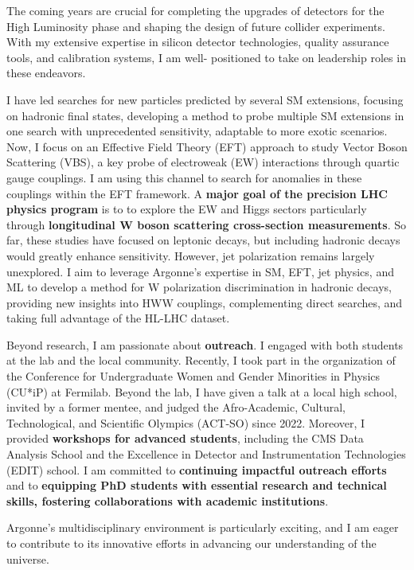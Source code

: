 {\begin{flushleft}
The coming years are crucial for completing the upgrades of detectors for the High Luminosity
phase and shaping the design of future collider experiments. With my extensive expertise in
silicon detector technologies, quality assurance tools, and calibration systems, I am well-
positioned to take on leadership roles in these endeavors.

I have led searches for new particles predicted by several SM extensions, focusing on hadronic final states, developing a method to probe multiple SM extensions in one search with unprecedented sensitivity, adaptable to more exotic scenarios. Now, I focus on an Effective Field Theory (EFT) approach to study Vector Boson Scattering (VBS), a key probe of electroweak (EW) interactions through quartic gauge couplings. I am using this channel to search for anomalies in these couplings within the EFT framework. 
A {\bf major goal of the precision LHC physics program} is to to explore the EW and Higgs sectors particularly through {\bf longitudinal W boson scattering cross-section measurements}.  So far, these studies have focused on leptonic decays, but including hadronic decays would greatly enhance sensitivity. However, jet polarization remains largely unexplored. I aim to leverage Argonne’s expertise in SM, EFT, jet physics, and ML to develop a method for W polarization discrimination in hadronic decays, providing new insights into HWW couplings, complementing direct searches, and taking full advantage of the HL-LHC dataset.

Beyond research, I am passionate about {\bf outreach}. I engaged with both students at the lab and the local community. Recently, I took part in the organization of the Conference for Undergraduate Women and Gender Minorities in Physics (CU*iP) at Fermilab. Beyond the lab, I have given a talk at a local high school, invited by a former mentee, and judged the Afro-Academic, Cultural, Technological, and Scientific Olympics (ACT-SO) since 2022. Moreover, I provided {\bf workshops for advanced students}, including the CMS Data Analysis School and the Excellence in Detector and Instrumentation Technologies (EDIT) school. I am committed to {\bf continuing impactful outreach efforts} and to {\bf equipping PhD students with essential research and technical skills, fostering collaborations with academic institutions}.

Argonne’s multidisciplinary environment is particularly exciting, and I am eager to contribute to its innovative efforts in advancing our understanding of the universe.



\end{flushleft}}

